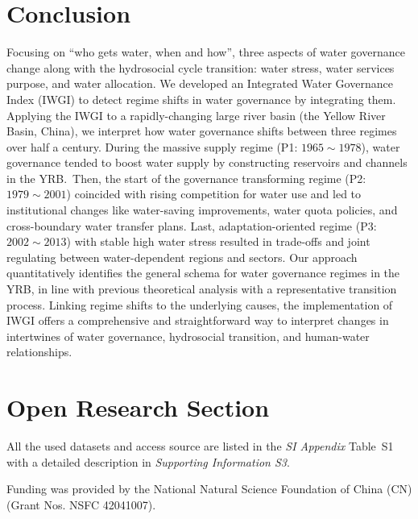 \documentclass[draft]{../agujournal2019}
\begin{document}
\section{Conclusion}\label{sec13}
Focusing on ``who gets water, when and how'', three aspects of water governance change along with the hydrosocial cycle transition: water stress, water services purpose, and water allocation.
We developed an Integrated Water Governance Index (IWGI) to detect regime shifts in water governance by integrating them. Applying the IWGI to a rapidly-changing large river basin (the Yellow River Basin, China), we interpret how water governance shifts between three regimes over half a century.
During the massive supply regime (P1: $1965 \sim 1978$), water governance tended to boost water supply by constructing reservoirs and channels in the YRB.\
Then, the start of the governance transforming regime (P2: $1979 \sim 2001$) coincided with rising competition for water use and led to institutional changes like water-saving improvements, water quota policies, and cross-boundary water transfer plans.
Last, adaptation-oriented regime (P3: $2002 \sim 2013$) with stable high water stress resulted in trade-offs and joint regulating between water-dependent regions and sectors.
Our approach quantitatively identifies the general schema for water governance regimes in the YRB, in line with previous theoretical analysis with a representative transition process.
Linking regime shifts to the underlying causes, the implementation of IWGI offers a comprehensive and straightforward way to interpret changes in intertwines of water governance, hydrosocial transition, and human-water relationships.
























\section*{Open Research Section}
All the used datasets and access source are listed in the \textit{SI Appendix} Table~S1 with a detailed description in \textit{Supporting Information S3}.



\acknowledgments
Funding was provided by the National Natural Science Foundation of China (CN) (Grant Nos. NSFC 42041007).


\end{document}
